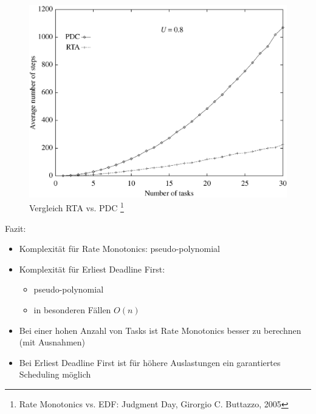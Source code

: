 \begin{frame}{\subsecname}
	\begin{center}
	\begin{figure}
		\includegraphics[scale=.20]{graphics/vergleich/rtapdc.png}
		\caption{Vergleich RTA vs. PDC \footnote{Rate Monotonics vs. EDF: Judgment Day, Girorgio C. Buttazzo, 2005}}	
	\end{figure}

	\end{center}
\end{frame}

\begin{frame}{\subsecname}
	Fazit:
	\begin{itemize}
		\item Komplexität für Rate Monotonics: pseudo-polynomial
		\item Komplexität für Erliest Deadline First:
		\begin{itemize}
			\item pseudo-polynomial
			\item in besonderen Fällen $O(n)$
		\end{itemize}
		\item Bei einer hohen Anzahl von Tasks ist Rate Monotonics besser zu berechnen (mit Ausnahmen)
		\item Bei Erliest Deadline First ist für höhere Auslastungen ein garantiertes Scheduling möglich
	\end{itemize}
\end{frame}

